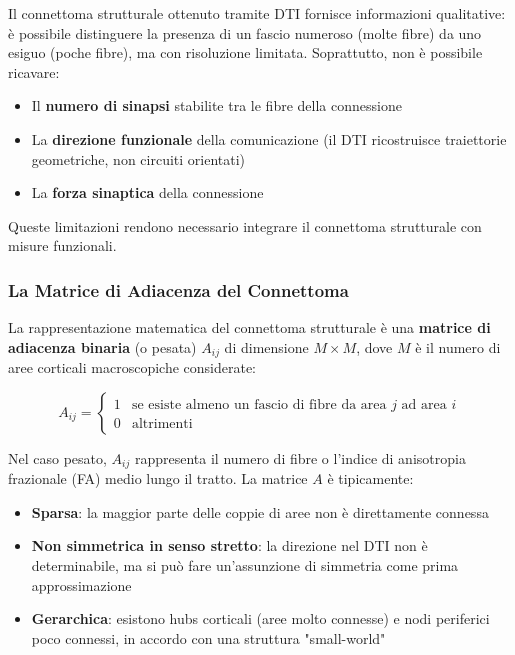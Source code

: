 Il connettoma strutturale ottenuto tramite DTI fornisce informazioni qualitative: è possibile distinguere la presenza di un fascio numeroso (molte fibre) da uno esiguo (poche fibre), ma con risoluzione limitata. Soprattutto, non è possibile ricavare:

\begin{itemize}
    \item Il \textbf{numero di sinapsi} stabilite tra le fibre della connessione
    \item La \textbf{direzione funzionale} della comunicazione (il DTI ricostruisce traiettorie geometriche, non circuiti orientati)
    \item La \textbf{forza sinaptica} della connessione
\end{itemize}

Queste limitazioni rendono necessario integrare il connettoma strutturale con misure funzionali.

\subsubsection{La Matrice di Adiacenza del Connettoma}

La rappresentazione matematica del connettoma strutturale è una \textbf{matrice di adiacenza binaria} (o pesata) $A_{ij}$ di dimensione $M \times M$, dove $M$ è il numero di aree corticali macroscopiche considerate:

\begin{equation}
A_{ij} = \begin{cases} 1 & \text{se esiste almeno un fascio di fibre da area } j \text{ ad area } i \\ 0 & \text{altrimenti} \end{cases}
\end{equation}

Nel caso pesato, $A_{ij}$ rappresenta il numero di fibre o l'indice di anisotropia frazionale (FA) medio lungo il tratto. La matrice $A$ è tipicamente:

\begin{itemize}
    \item \textbf{Sparsa}: la maggior parte delle coppie di aree non è direttamente connessa
    \item \textbf{Non simmetrica in senso stretto}: la direzione nel DTI non è determinabile, ma si può fare un'assunzione di simmetria come prima approssimazione
    \item \textbf{Gerarchica}: esistono hubs corticali (aree molto connesse) e nodi periferici poco connessi, in accordo con una struttura "small-world"
\end{itemize}




